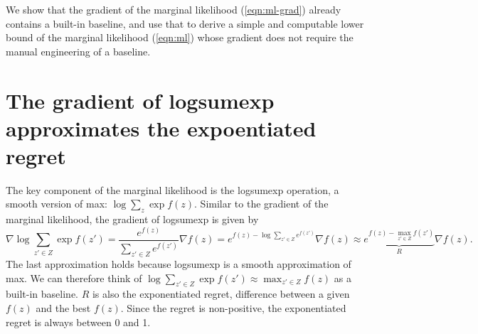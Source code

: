 \documentclass[12pt]{article}
\begin{document}
We show that the gradient of the marginal likelihood (\ref{eqn:ml-grad}) already contains
a built-in baseline, and use that to derive a simple and computable lower bound
of the marginal likelihood
(\ref{eqn:ml}) whose gradient does not require the manual engineering of a baseline.

\section{The gradient of logsumexp approximates the expoentiated regret}
The key component of the marginal likelihood is the logsumexp operation,
a smooth version of max: $\log \sum_z \exp f(z)$.
Similar to the gradient of the marginal likelihood,
the gradient of logsumexp is given by
$$
\nabla \log \sum_{z'\in Z} \exp f(z')
= \frac{e^{f(z)}}{\sum_{z' \in Z} e^{f(z')}} \nabla f(z)
= e^{f(z) - \log \sum_{z' \in Z} e^{f(z')}} \nabla f(z)
\approx \underbrace{e^{f(z) - \max_{z' \in Z} f(z')}}_{R} \nabla f(z).
$$
The last approximation holds because logsumexp is a smooth approximation of max.
We can therefore think of $\log \sum_{z'\in Z}\exp f(z')\approx \max_{z'\in Z} f(z)$
as a built-in baseline.
$R$ is also the exponentiated regret, difference between a given $f(z)$
and the best $f(z)$.
Since the regret is non-positive, the exponentiated regret is always between 0 and 1.
\end{document}
